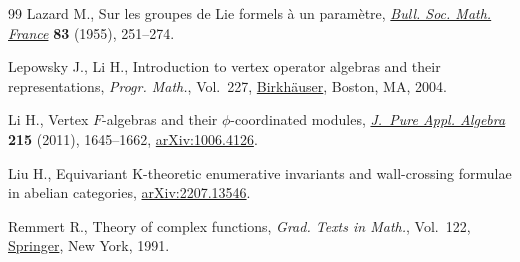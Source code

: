 \documentclass[pdftex]{sigma}
\numberwithin{equation}{section}
\theoremstyle{definition}
\begin{document}
\begin{thebibliography}{99}
Lazard M., Sur les groupes de {L}ie formels \`a un param\`etre,
 \href{https://doi.org/10.24033/bsmf.1462}{\textit{Bull. Soc. Math. France}}
 \textbf{83} (1955), 251--274.

Lepowsky J., Li H., Introduction to vertex operator algebras and their
 representations, \textit{Progr. Math.}, Vol.~227,
 \href{https://doi.org/10.1007/978-0-8176-8186-9}{Birkh\"auser}, Boston, MA,
 2004.

Li H., Vertex {$F$}-algebras and their {$\phi$}-coordinated modules,
 \href{https://doi.org/10.1016/j.jpaa.2010.10.001}{\textit{J.~Pure Appl.
 Algebra}} \textbf{215} (2011), 1645--1662,
 \href{http://arxiv.org/abs/1006.4126}{arXiv:1006.4126}.

Liu H., Equivariant {K}-theoretic enumerative invariants and wall-crossing
 formulae in abelian categories,
 \href{http://arxiv.org/abs/2207.13546}{arXiv:2207.13546}.

Remmert R., Theory of complex functions, \textit{Grad. Texts in Math.}, Vol.~122, \href{https://doi.org/10.1007/978-1-4612-0939-3}{Springer}, New York, 1991.

\end{thebibliography}\LastPageEnding
\end{document}
